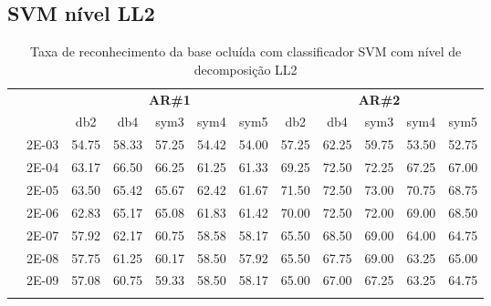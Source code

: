 \subsection{SVM nível LL2}
\begin{table}[H]
	\centering
    \normalsize
	\caption{Taxa de reconhecimento da base ocluída com classificador SVM com nível de decomposição LL2}
	\begin{tabular}{|c|c|c c c c c|c c c c c|}
\cline{3-12}
\multicolumn{2}{c|}{\multirow{2}{*}{}} & \multicolumn{5}{c|}{\textbf{AR\#1}}  & \multicolumn{5}{c|}{\textbf{AR\#2}} \\\cline{3-12}

\multicolumn{2}{c|}{}  & db2 & db4 & sym3 & sym4 & sym5 & db2 & db4& sym3 & sym4 & sym5 \\\hline
\multicolumn{1}{|c|}{ \multirow{6}{*}{\rotatebox[origin=c]{90}{\textbf{Sigma}}} }
&2E-03	&54.75	&58.33	&57.25	&54.42	&54.00	&57.25	&62.25	&59.75	&53.50&	52.75	\\\cline{2-12}
&2E-04	&63.17	&66.50	&66.25	&61.25	&61.33	&69.25	&72.50	&72.25	&67.25&	67.00	\\\cline{2-12}
&2E-05	&63.50	&65.42	&65.67	&62.42	&61.67	&71.50	&72.50	&73.00	&70.75&	68.75	\\\cline{2-12}
&2E-06	&62.83	&65.17	&65.08	&61.83	&61.42	&70.00	&72.50	&72.00	&69.00&	68.50	\\\cline{2-12}
&2E-07	&57.92	&62.17	&60.75	&58.58	&58.17	&65.50	&68.50	&69.00	&64.00&	64.75	\\\cline{2-12}
&2E-08	&57.75	&61.25	&60.17	&58.50	&57.92	&65.50	&67.75	&69.00	&63.25&	65.00	\\\cline{2-12}
&2E-09	&57.08	&60.75	&59.33	&58.50	&58.17	&65.00	&67.00	&67.25	&63.25&	64.75	
\\ \midrule
\multicolumn{12}{c}{}\\ 


\end{tabular}
\end{table}
